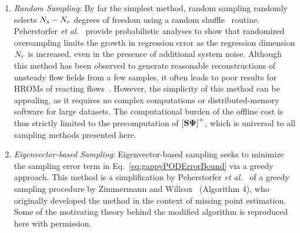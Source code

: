 \begin{enumerate}
	\item \textit{Random Sampling}: By far the simplest method, random sampling randomly selects $N_s - N_r$ degrees of freedom using a random shuffle \CC\ routine. Peherstorfer \textit{et al.}~\cite{Peherstorfer2020} provide probabilistic analyses to show that randomized oversampling limits the growth in regression error as the regression dimension $N_r$ is increased, even in the presence of additional system noise. Although this method has been observed to generate reasonable reconstructions of unsteady flow fields from a few samples, it often leads to poor results for HROMs of reacting flows~\cite{Wentland2021}. However, the simplicity of this method can be appealing, as it requires no complex computations or distributed-memory software for large datasets. The computational burden of the offline cost is thus strictly limited to the precomputation of $\left[\sampMat \deimBasis\right]^+$, which is universal to all sampling methods presented here.

	\item \textit{Eigenvector-based Sampling}: Eigenvector-based sampling seeks to minimize the sampling error term in Eq.~\ref{eq:gappyPODErrorBound} via a greedy approach. This method is a simplification by Peherstorfer \textit{et al.}~\cite{Peherstorfer2020} of a greedy sampling procedure by Zimmermann and Willcox~\cite{Zimmermann2016} (Algorithm 4), who originally developed the method in the context of missing point estimation. Some of the motivating theory behind the modified algorithm is reproduced here with permission.


\end{enumerate}
